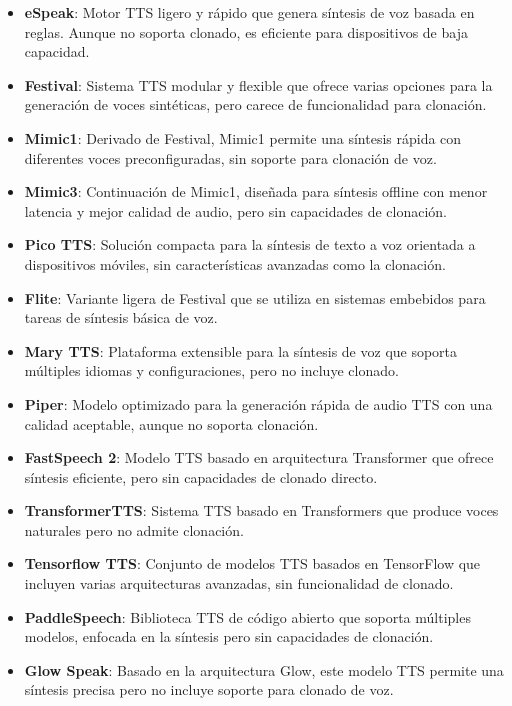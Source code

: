 \begin{itemize}
    \item \textbf{eSpeak}: Motor TTS ligero y rápido que genera síntesis de voz basada en reglas. Aunque no soporta clonado, es eficiente para dispositivos de baja capacidad.
    \item \textbf{Festival}: Sistema TTS modular y flexible que ofrece varias opciones para la generación de voces sintéticas, pero carece de funcionalidad para clonación.
    \item \textbf{Mimic1}: Derivado de Festival, Mimic1 permite una síntesis rápida con diferentes voces preconfiguradas, sin soporte para clonación de voz.
    \item \textbf{Mimic3}: Continuación de Mimic1, diseñada para síntesis offline con menor latencia y mejor calidad de audio, pero sin capacidades de clonación.
    \item \textbf{Pico TTS}: Solución compacta para la síntesis de texto a voz orientada a dispositivos móviles, sin características avanzadas como la clonación.
    \item \textbf{Flite}: Variante ligera de Festival que se utiliza en sistemas embebidos para tareas de síntesis básica de voz.
    \item \textbf{Mary TTS}: Plataforma extensible para la síntesis de voz que soporta múltiples idiomas y configuraciones, pero no incluye clonado.
    \item \textbf{Piper}: Modelo optimizado para la generación rápida de audio TTS con una calidad aceptable, aunque no soporta clonación.
    \item \textbf{FastSpeech 2}: Modelo TTS basado en arquitectura Transformer que ofrece síntesis eficiente, pero sin capacidades de clonado directo.
    \item \textbf{TransformerTTS}: Sistema TTS basado en Transformers que produce voces naturales pero no admite clonación.
    \item \textbf{Tensorflow TTS}: Conjunto de modelos TTS basados en TensorFlow que incluyen varias arquitecturas avanzadas, sin funcionalidad de clonado.
    \item \textbf{PaddleSpeech}: Biblioteca TTS de código abierto que soporta múltiples modelos, enfocada en la síntesis pero sin capacidades de clonación.
    \item \textbf{Glow Speak}: Basado en la arquitectura Glow, este modelo TTS permite una síntesis precisa pero no incluye soporte para clonado de voz.
\end{itemize}

